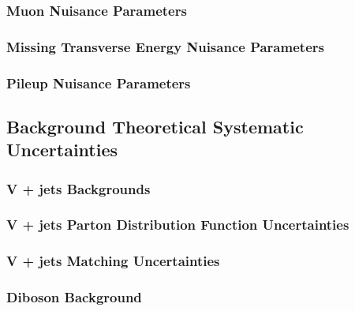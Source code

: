 \documentclass[10pt,twoside,cucitura,classica,english,openany]{toptesi}
\begin{document}


\subsubsection{Muon Nuisance Parameters}
\label{sec:muon-nuis-param}



\subsubsection{Missing Transverse Energy Nuisance Parameters}
\label{sec:met-np}



\subsubsection{Pileup Nuisance Parameters}
\label{sec:pile-nuis-param}



\subsection{Background Theoretical Systematic Uncertainties}
\label{sec:backgr-theor-syst}



\subsubsection{V + jets Backgrounds}
\label{sec:v-+-jets}



\subsubsection{V + jets Parton Distribution Function Uncertainties}
\label{sec:v-+-jets-pdf}



\subsubsection{V + jets Matching Uncertainties}
\label{sec:v-+-jets-matching}



\subsubsection{Diboson Background}
\label{sec:diboson-background}
\end{document}
